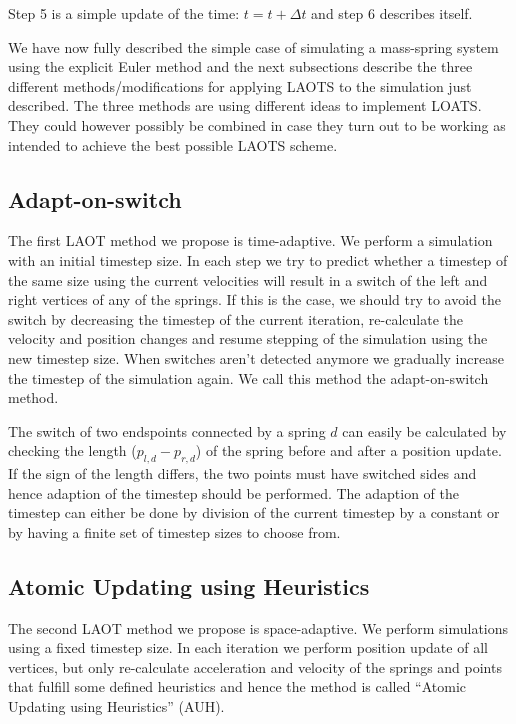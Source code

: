 \documentclass[11pt]{article}
\begin{document}
Step 5 is a simple update of the time: $t = t + \Delta t$ and step 6 describes
itself.

We have now fully described the simple case of simulating a mass-spring system
using the explicit Euler method and the next subsections describe the three
different methods/modifications for applying LAOTS to the simulation just
described. The three methods are using different ideas to implement LOATS. They
could however possibly be combined in case they turn out to be working as
intended to achieve the best possible LAOTS scheme.

\subsection{Adapt-on-switch}
\label{sec:method_switch}
The first LAOT method we propose is time-adaptive. We perform a simulation
with an initial timestep size. In each step we try to predict whether a timestep
of the same size using the current velocities will result in a switch of the
left and right vertices of any of the springs. If this is the case, we should
try to avoid the switch by decreasing the timestep of the current iteration,
re-calculate the velocity and position changes and resume stepping of the
simulation using the new timestep size. When switches aren't detected anymore
we gradually increase the timestep of the simulation again. We call this
method the adapt-on-switch method.

The switch of two endspoints connected by a spring $d$ can easily be
calculated by checking the length ($p_{l,d} - p_{r,d}$) of the spring before
and after a position update. If the sign of the length differs, the two
points must have switched sides and hence adaption of the timestep should be
performed. The adaption of the timestep can either be done by division of the
current timestep by a constant or by having a finite set of timestep sizes to
choose from.

\subsection{Atomic Updating using Heuristics}
The second LAOT method we propose is space-adaptive. We perform simulations
using a fixed timestep size. In each iteration we perform position update of
all vertices, but only re-calculate acceleration and velocity of the springs
and points that fulfill some defined heuristics and hence the method is called
``Atomic Updating using Heuristics'' (AUH).
\end{document}
